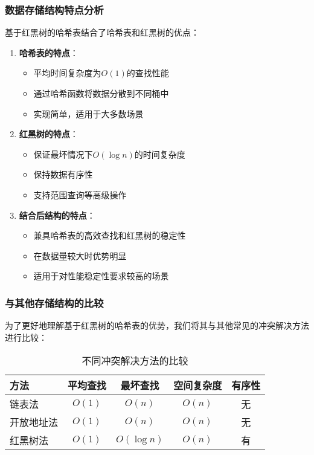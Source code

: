 \documentclass[12pt,a4paper]{article}
\begin{document}
\subsubsection{数据存储结构特点分析}
基于红黑树的哈希表结合了哈希表和红黑树的优点：

\begin{enumerate}
\item \textbf{哈希表的特点}：
  \begin{itemize}
  \item 平均时间复杂度为$O(1)$的查找性能
  \item 通过哈希函数将数据分散到不同桶中
  \item 实现简单，适用于大多数场景
  \end{itemize}
  
\item \textbf{红黑树的特点}：
  \begin{itemize}
  \item 保证最坏情况下$O(\log n)$的时间复杂度
  \item 保持数据有序性
  \item 支持范围查询等高级操作
  \end{itemize}
  
\item \textbf{结合后结构的特点}：
  \begin{itemize}
  \item 兼具哈希表的高效查找和红黑树的稳定性
  \item 在数据量较大时优势明显
  \item 适用于对性能稳定性要求较高的场景
  \end{itemize}
\end{enumerate}

\subsubsection{与其他存储结构的比较}
为了更好地理解基于红黑树的哈希表的优势，我们将其与其他常见的冲突解决方法进行比较：

\begin{table}[h]
\centering
\caption{不同冲突解决方法的比较}
\begin{tabular}{|l|c|c|c|c|}
\hline
方法 & 平均查找 & 最坏查找 & 空间复杂度 & 有序性 \\
\hline
链表法 & $O(1)$ & $O(n)$ & $O(n)$ & 无 \\
开放地址法 & $O(1)$ & $O(n)$ & $O(n)$ & 无 \\
红黑树法 & $O(1)$ & $O(\log n)$ & $O(n)$ & 有 \\
\hline
\end{tabular}
\end{table}
\end{document}
